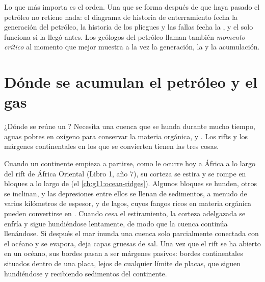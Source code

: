 Lo que más importa es el orden. Una  que se forma después de que haya
pasado el petróleo no retiene nada: el diagrama de historia de enterramiento
fecha la generación del petróleo, la historia de los pliegues y las fallas
fecha la , y el  solo funciona si la  llegó
antes. Los geólogos del petróleo llaman también \emph{momento crítico} al
momento que mejor muestra a la vez la generación, la  y la acumulación.

\section{Dónde se acumulan el petróleo y el gas}

¿Dónde se reúne un ? Necesita una cuenca que se hunda
durante mucho tiempo, aguas pobres en oxígeno para conservar la materia
orgánica, y . Los rifts y los márgenes continentales en los que se
convierten tienen las tres cosas.

Cuando un continente empieza a partirse, como le ocurre hoy a África a lo
largo del rift de África Oriental (Libro 1, año 7), su corteza se estira y se
rompe en bloques a lo largo de  (el \cref{ch:g11:ocean-ridges}).
Algunos bloques se hunden, otros se inclinan, y las depresiones entre ellos se
llenan de sedimentos, a menudo de varios kilómetros de espesor, y de lagos,
cuyos fangos ricos en materia orgánica pueden convertirse en . Cuando
cesa el estiramiento, la corteza adelgazada se enfría y sigue hundiéndose
lentamente, de modo que la cuenca continúa llenándose. Si después el mar
inunda una cuenca solo parcialmente conectada con el océano y se evapora,
deja capas gruesas de sal. Una vez que el rift se ha abierto en un océano,
sus bordes pasan a ser márgenes pasivos: bordes continentales situados dentro
de una placa, lejos de cualquier límite de placas, que siguen hundiéndose y
recibiendo sedimentos del continente.

